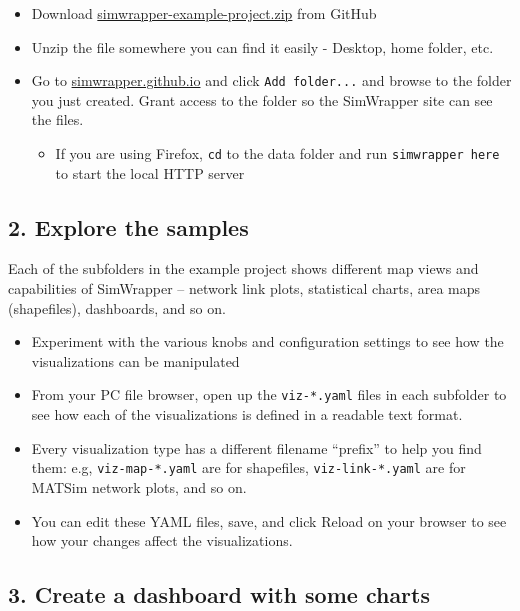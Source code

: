 \begin{itemize}
\tightlist
\item
  Download
  \href{https://github.com/simwrapper/simwrapper-example-project/archive/refs/heads/main.zip}{simwrapper-example-project.zip}
  from GitHub
\item
  Unzip the file somewhere you can find it easily - Desktop, home
  folder, etc.
\item
  Go to \href{https://simwrapper.github.io/site}{simwrapper.github.io}
  and click \texttt{Add\ folder...} and browse to the folder you just
  created. Grant access to the folder so the SimWrapper site can see the
  files.
  \begin{itemize}
  \tightlist
  \item
    If you are using Firefox, \texttt{cd} to the data folder and run
    \texttt{simwrapper\ here} to start the local HTTP server
  \end{itemize}
\end{itemize}

\hypertarget{explore-the-samples}{%
\subsection{2. Explore the samples}\label{explore-the-samples}}

Each of the subfolders in the example project shows different map views
and capabilities of SimWrapper -- network link plots, statistical
charts, area maps (shapefiles), dashboards, and so on.

\begin{itemize}
\tightlist
\item
  Experiment with the various knobs and configuration settings to see
  how the visualizations can be manipulated
\item
  From your PC file browser, open up the \texttt{viz-*.yaml} files in
  each subfolder to see how each of the visualizations is defined in a
  readable text format.
\item
  Every visualization type has a different filename ``prefix'' to help
  you find them: e.g, \texttt{viz-map-*.yaml} are for shapefiles,
  \texttt{viz-link-*.yaml} are for MATSim network plots, and so on.
\item
  You can edit these YAML files, save, and click Reload on your browser
  to see how your changes affect the visualizations.
\end{itemize}

\hypertarget{create-a-dashboard-with-some-charts}{%
\subsection{3. Create a dashboard with some
charts}\label{create-a-dashboard-with-some-charts}}

